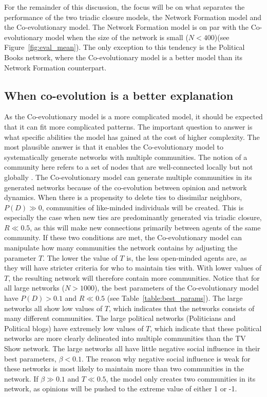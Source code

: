 \documentclass[11pt]{article}
\begin{document}
\noindent For the remainder of this discussion, the focus will be on what separates the performance of the two triadic closure models, the Network Formation model and the Co-evolutionary model. 
The Network Formation model is on par with the Co-evolutionary model when the size of the network is small ($N < 400$)(see Figure~\ref{fig:eval_mean}). The only exception to this tendency is the Political Books network, where the Co-evolutionary model is a better model than its Network Formation counterpart.

\subsection{When co-evolution is a better explanation}
As the Co-evolutionary model is a more complicated model, it should be expected that it can fit more complicated patterns. The important question to answer is what specific abilities the model has gained at the cost of higher complexity.
The most plausible answer is that it enables the Co-evolutionary model to systematically generate networks with multiple communities. The notion of a community here refers to a set of nodes that are well-connected locally but not globally \cite{yang2011detecting}. The Co-evolutionary model can generate multiple communities in its generated networks because of the co-evolution between opinion and network dynamics. 
When there is a propensity to delete ties to dissimilar neighbors, $P(D) \gg 0$, communities of like-minded individuals will be created. This is especially the case when new ties are predominantly generated via triadic closure, $R \ll 0.5$, as this will make new connections primarily between agents of the same community. 
If these two conditions are met, the Co-evolutionary model can manipulate how many communities the network contains by adjusting the parameter $T$. 
The lower the value of $T$ is, the less open-minded agents are, as they will have stricter criteria for who to maintain ties with. With lower values of $T$, the resulting network will therefore contain more communities. Notice that for all large networks ($N > 1000$), the best parameters of the Co-evolutionary model have $P(D) > 0.1$ and $R \ll 0.5$ (see Table~\ref{table:best_params}). The large networks all show low values of $T$, which indicates that the networks consists of many different communities. The large political networks (Politicians and Political blogs) have extremely low values of $T$, which indicate that these political networks are more clearly delineated into multiple communities than the TV Show network. The large networks all have little negative social influence in their best parameters, $\beta < 0.1$. The reason why negative social influence is weak for these networks is most likely to maintain more than two communities in the network. If $\beta \gg 0.1$ and $T \ll 0.5$, the model only creates two communities in its network, as opinions will be pushed to the extreme value of either 1 or -1. 
\end{document}
